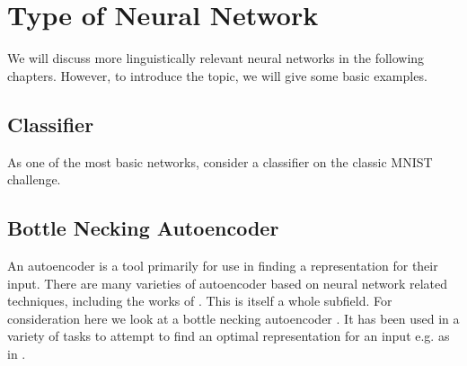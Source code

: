 \documentclass[12pt,parskip]{komatufte}
\begin{document}





\section{Type of Neural Network}
We will discuss more linguistically relevant neural networks in the following chapters.
However, to introduce the topic, we will give some basic examples.


\subsection{Classifier}
As one of the most basic networks, consider a classifier on the classic MNIST challenge.





\subsection{Bottle Necking Autoencoder}
An autoencoder is a tool primarily for use in finding a representation for their input.
There are many varieties of autoencoder based on neural network related techniques, including the works of \textcite{hinton2002RBM,hinton2006reducing,hinton2006fastDBN,vincent2010stacked,ICML2012Chen_416,2014VAE}.
This is itself a whole subfield.
For consideration here we look at a bottle necking autoencoder
\parencite{bourlard1988auto,japkowicz2000nonlinear}.
It has been used in a variety of tasks to attempt to find an optimal representation for an input e.g. as in .
\end{document}
